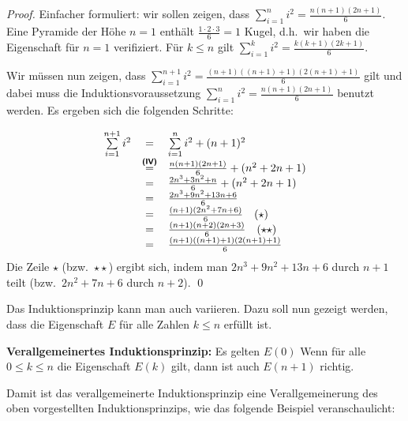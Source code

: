 \goodbreak
\begin{proof}
Einfacher formuliert: wir sollen zeigen, dass $\sum\limits_{i=1}^n i^2 =
\frac{n(n+1)(2n+1)}{6}$.
\induproof%
{Eine Pyramide der Höhe $n = 1$ enthält $\frac{1 \cdot 2 \cdot 3}{6} =
  1$ Kugel, d.h.~wir haben die Eigenschaft für $n = 1$ verifiziert.}%
{Für $k \le n$ gilt $\sum\limits_{i=1}^k i^2 = \frac{k(k+1)(2k+1)}{6}$.}%
{%
Wir müssen nun zeigen, dass $\sum\limits_{i=1}^{n+1} i^2 =
\frac{(n+1)((n+1)+1)(2(n+1)+1)}{6}$ gilt und dabei muss die
Induktionsvoraussetzung $\sum\limits_{i=1}^n i^2 = \frac{n(n+1)(2n+1)}{6}$
benutzt werden. Es ergeben sich die folgenden Schritte: 

\begin{displaymath}
\begin{array}{rcl}
\sum\limits_{i=1}^{n+1}i^2 &=& \sum\limits_{i=1}^{n}i^2 + (n + 1)^2\\
&\stackrel{\text{\textbf{\textsf{(IV)}}}}{=}& \frac{n(n+1)(2n+1)}{6} +
(n^2 + 2n + 1)\\
&=& \frac{2n^3 + 3n^2+n}{6} + (n^2 + 2n + 1)\\
&=& \frac{2n^3 + 9n^2+13n + 6}{6}\\
&=& \frac{(n+1)(2n^2+7n+6)}{6} \quad (\star)\\
&=& \frac{(n+1)(n+2)(2n+3)}{6} \quad (\star\star)\\
&=& \frac{(n+1)((n+1) + 1)(2(n + 1) + 1)}{6}\\
\end{array}
\end{displaymath}
Die Zeile $\star$ (bzw.~$\star\star$) ergibt sich, indem man $2n^3 +
9n^2+13n + 6$ durch $n+1$ teilt (bzw.~$2n^2+7n+6$ durch $n+2$). \qed
}
\end{proof}
\smallskip

\noindent Das Induktionsprinzip kann man auch variieren. Dazu soll nun gezeigt
werden, dass die Eigenschaft $E$ für alle Zahlen $k \le n$ erfüllt
ist.

\noindent\textbf{Verallgemeinertes Induktionsprinzip:} Es gelten 
\indudef%
{$E(0)$}%
{Wenn für alle $0 \le k \le n$ die Eigenschaft $E(k)$ gilt, dann ist 
auch $E(n+1)$ richtig.}
\medskip

Damit ist das verallgemeinerte Induktionsprinzip eine
Verallgemeinerung des oben vorgestellten Induktionsprinzips, wie das
folgende Beispiel veranschaulicht:

